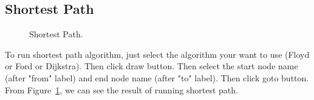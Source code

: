 \documentclass{article}
\begin{document}
\subsection{Shortest Path}
\begin{figure}[H]
\centering
{}
   \caption{Shortest Path.}
    \label{fig:shortest path}
\end{figure}
To run shortest path algorithm, just select the algorithm your want to use (Floyd or Ford or Dijkstra). Then click draw button. Then select the start node name (after "from" label) and end node name (after "to" label). Then click goto button. From Figure~\ref{fig:shortest path}, we can see the result of running shortest path.\\ 
 
\end{document}
